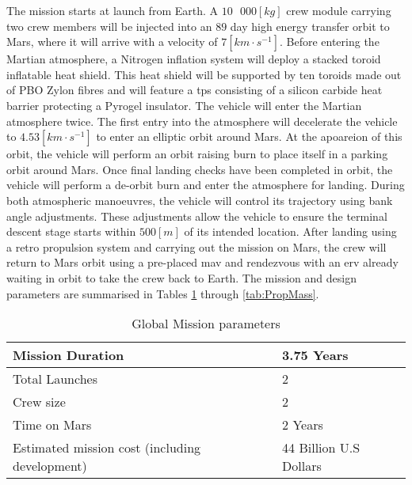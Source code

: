 The mission starts at launch from Earth. A $10\mbox{ }000 \left[kg\right]$ crew module carrying two crew members will be injected into an $89$ day high energy transfer orbit to Mars, where it will arrive with a velocity of $7 \left[km\cdot s^{-1}\right]$. Before entering the Martian atmosphere, a Nitrogen inflation system will deploy a stacked toroid inflatable heat shield. This heat shield will be supported by ten toroids made out of PBO Zylon\textsuperscript{\textregistered} fibres and will feature a \gls{tps} consisting of a silicon carbide heat barrier protecting a Pyrogel\textsuperscript{\textregistered} insulator. The vehicle will enter the Martian atmosphere twice. The first entry into the atmosphere will decelerate the vehicle to $4.53 \left[km\cdot s^{-1}\right]$ to enter an elliptic orbit around Mars. At the apoareion of this orbit, the vehicle will perform an orbit raising burn to place itself in a parking orbit around Mars. Once final landing checks have been completed in orbit, the vehicle will perform a de-orbit burn and enter the atmosphere for landing. During both atmospheric manoeuvres, the vehicle will control its trajectory using bank angle adjustments. These adjustments allow the vehicle to ensure the terminal descent stage starts within $500 \left[m\right]$ of its intended location. After landing using a retro propulsion system and carrying out the mission on Mars, the crew will return to Mars orbit using a pre-placed \gls{mav} and rendezvous with an \gls{erv} already waiting in orbit to take the crew back to Earth. The mission and design parameters are summarised in Tables \ref{tab:MissionPar} through \ref{tab:PropMass}.


\begin{table}[H]
	\centering
	\caption{Global Mission parameters}
	\label{tab:MissionPar}
	\begin{tabular}{|p{}|p{}|} \hline
		Mission Duration				             	& 	3.75 Years						\\ \hline 
		Total Launches       							&	2  		   	  					\\ \hline
		Crew size				 						&	2     	  						\\ \hline
		Time on Mars				              	   	&  	2 Years    						\\ \hline
		Estimated mission cost (including development) 	&  	44 Billion U.S Dollars			\\ \hline
	\end{tabular}
\end{table}

